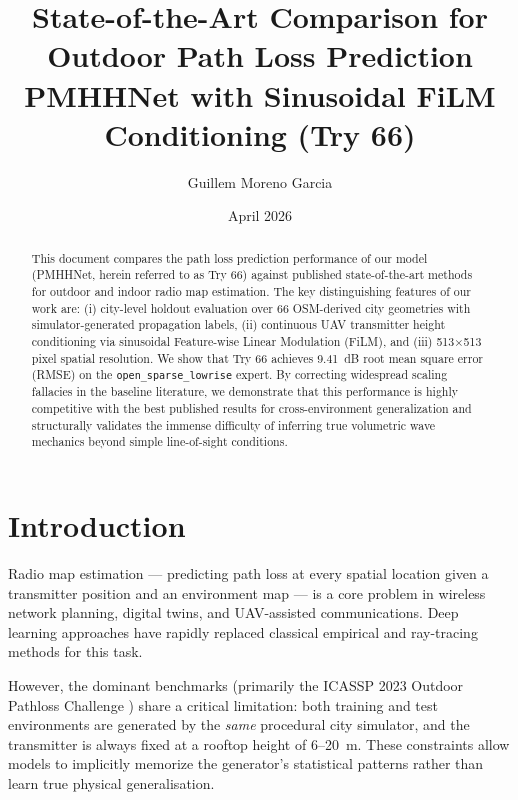 \documentclass[11pt,a4paper]{article}
\title{%
    \textbf{State-of-the-Art Comparison for Outdoor Path Loss Prediction}\\[0.5em]
    \large PMHHNet with Sinusoidal FiLM Conditioning (Try 66)\\[0.3em]
}
\author{Guillem Moreno Garcia}
\date{April 2026}
\begin{document}
\maketitle
\thispagestyle{fancy}

\begin{abstract}
This document compares the path loss prediction performance of our model (PMHHNet,
herein referred to as Try 66) against published state-of-the-art methods for
outdoor and indoor radio map estimation. The key distinguishing features of our
work are: (i) city-level holdout evaluation over 66 OSM-derived city geometries
with simulator-generated propagation labels,
(ii) continuous UAV transmitter height conditioning via sinusoidal Feature-wise
Linear Modulation (FiLM), and (iii) 513$\times$513 pixel spatial resolution.
We show that Try 66 achieves 9.41~dB root mean square error (RMSE) on the
\texttt{open\_sparse\_lowrise} expert. By correcting widespread scaling fallacies in the baseline literature, we demonstrate that this performance is highly competitive with the best published results for cross-environment generalization and structurally validates the immense difficulty of inferring true volumetric wave mechanics beyond simple line-of-sight conditions.
\end{abstract}

\tableofcontents
\newpage

\section{Introduction}
\label{sec:intro}

Radio map estimation — predicting path loss at every spatial location given a
transmitter position and an environment map — is a core problem in wireless
network planning, digital twins, and UAV-assisted communications. Deep learning
approaches have rapidly replaced classical empirical and ray-tracing methods for
this task.

However, the dominant benchmarks (primarily the ICASSP 2023 Outdoor Pathloss
Challenge \cite{icassp2023challenge}) share a critical limitation: both training
and test environments are generated by the \emph{same} procedural city simulator,
and the transmitter is always fixed at a rooftop height of 6--20~m. These
constraints allow models to implicitly memorize the generator's statistical patterns
rather than learn true physical generalisation. 
\end{document}
